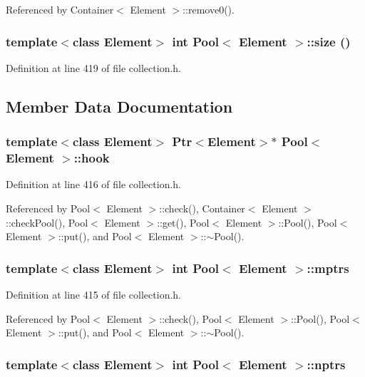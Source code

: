 Referenced by Container$<$ Element $>$::remove0().\hypertarget{structPool_35eacf63cd8789880331d6a1e60e40d7}{
\subsubsection[{size}]{\setlength{\rightskip}{0pt plus 5cm}template$<$class Element$>$ int {\bf Pool}$<$ Element $>$::size ()}}
\label{structPool_35eacf63cd8789880331d6a1e60e40d7}




Definition at line 419 of file collection.h.

\subsection{Member Data Documentation}
\hypertarget{structPool_7d28b4715d9de0dbf13f8188e726a49f}{
\subsubsection[{hook}]{\setlength{\rightskip}{0pt plus 5cm}template$<$class Element$>$ {\bf Ptr}$<$Element$>$$\ast$ {\bf Pool}$<$ Element $>$::{\bf hook}}}
\label{structPool_7d28b4715d9de0dbf13f8188e726a49f}




Definition at line 416 of file collection.h.

Referenced by Pool$<$ Element $>$::check(), Container$<$ Element $>$::checkPool(), Pool$<$ Element $>$::get(), Pool$<$ Element $>$::Pool(), Pool$<$ Element $>$::put(), and Pool$<$ Element $>$::$\sim$Pool().\hypertarget{structPool_eaa0d991002928f9bd985fd15c8fb525}{
\subsubsection[{mptrs}]{\setlength{\rightskip}{0pt plus 5cm}template$<$class Element$>$ int {\bf Pool}$<$ Element $>$::{\bf mptrs}}}
\label{structPool_eaa0d991002928f9bd985fd15c8fb525}




Definition at line 415 of file collection.h.

Referenced by Pool$<$ Element $>$::check(), Pool$<$ Element $>$::Pool(), Pool$<$ Element $>$::put(), and Pool$<$ Element $>$::$\sim$Pool().\hypertarget{structPool_1821fe943de779fbf3b69beae8e7a7b1}{
\subsubsection[{nptrs}]{\setlength{\rightskip}{0pt plus 5cm}template$<$class Element$>$ int {\bf Pool}$<$ Element $>$::{\bf nptrs}}}
\label{structPool_1821fe943de779fbf3b69beae8e7a7b1}




